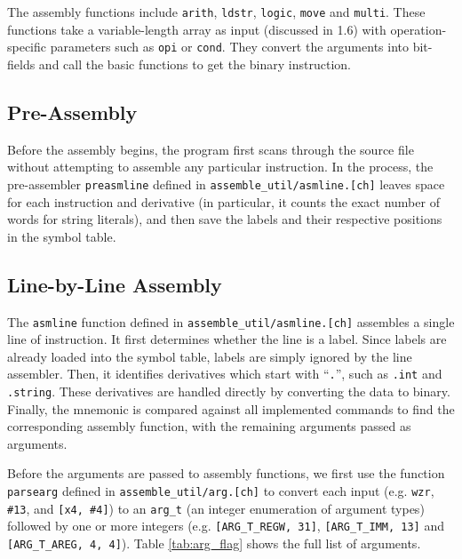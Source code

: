 \documentclass[11pt]{article}
\begin{document}
The assembly functions include \texttt{arith}, \texttt{ldstr}, \texttt{logic}, \texttt{move} and \texttt{multi}. These functions take a variable-length array as input (discussed in 1.6) with operation-specific parameters such as \texttt{opi} or \texttt{cond}. They convert the arguments into bit-fields and call the basic functions to get the binary instruction.

\subsection{Pre-Assembly}

Before the assembly begins, the program first scans through the source file without attempting to assemble any particular instruction. In the process, the pre-assembler \texttt{preasmline} defined in \texttt{assemble\_util/asmline.[ch]} leaves space for each instruction and derivative (in particular, it counts the exact number of words for string literals), and then save the labels and their respective positions in the symbol table.

\subsection{Line-by-Line Assembly}

The \texttt{asmline} function defined in \texttt{assemble\_util/asmline.[ch]} assembles a single line of instruction. It first determines whether the line is a label. Since labels are already loaded into the symbol table, labels are simply ignored by the line assembler. Then, it identifies derivatives which start with ``\texttt{.}'', such as \texttt{.int} and \texttt{.string}. These derivatives are handled directly by converting the data to binary. Finally, the mnemonic is compared against all implemented commands to find the corresponding assembly function, with the remaining arguments passed as arguments.

Before the arguments are passed to assembly functions, we first use the function \texttt{parsearg} defined in \texttt{assemble\_util/arg.[ch]} to convert each input (e.g. \texttt{wzr}, \texttt{\#13}, and \texttt{[x4, \#4]}) to an \texttt{arg\_t} (an integer enumeration of argument types) followed by one or more integers (e.g. \texttt{[ARG\_T\_REGW, 31]}, \texttt{[ARG\_T\_IMM, 13]} and \texttt{[ARG\_T\_AREG, 4, 4]}). Table \ref{tab:arg_flag} shows the full list of arguments.
\end{document}
